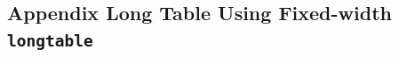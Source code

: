 \documentclass[phd,showframe]{ndsu-thesis-2022}
\begin{document}
\mysectop
\subsection{Appendix Long Table Using Fixed-width \texttt{longtable}}

\end{document}
